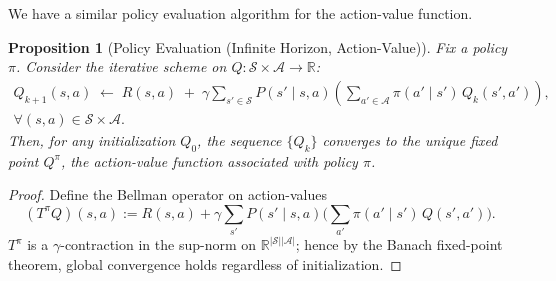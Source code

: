 \documentclass[
]{book}
\newtheorem{proposition}{Proposition}[chapter]
\theoremstyle{definition}
\theoremstyle{definition}
\theoremstyle{definition}
\theoremstyle{definition}
\theoremstyle{remark}
\begin{document}
We have a similar policy evaluation algorithm for the action-value function.

\begin{proposition}[Policy Evaluation (Infinite Horizon, Action-Value)]
\protect\hypertarget{prp:PolicyEvaluationInfiniteHorizonActionValue}{}\label{prp:PolicyEvaluationInfiniteHorizonActionValue}Fix a policy \(\pi\). Consider the iterative scheme on \(Q:\mathcal{S}\times\mathcal{A}\to\mathbb{R}\):
\begin{equation}
\begin{split}
Q_{k+1}(s,a) \;\gets\; R(s,a)
\;+\; \gamma \sum_{s'\in\mathcal{S}} P(s'\mid s,a)\!\left(\sum_{a'\in\mathcal{A}} \pi(a'\mid s')\, Q_k(s',a')\right), 
\\
\forall (s,a)\in\mathcal{S}\times\mathcal{A}.
\end{split}
\label{eq:PolicyEvaluationInfiniteHorizonActionValue}
\end{equation}
Then, for any initialization \(Q_0\), the sequence \(\{Q_k\}\) converges to the unique fixed point \(Q^{\pi}\), the action-value function associated with policy \(\pi\).
\end{proposition}

\begin{proof}
Define the Bellman operator on action-values
\[
(T^{\pi}Q)(s,a) := R(s,a) + \gamma \sum_{s'} P(s'\mid s,a)\Big(\sum_{a'} \pi(a'\mid s')\, Q(s',a')\Big).
\]
\(T^{\pi}\) is a \(\gamma\)-contraction in the sup-norm on \(\mathbb{R}^{|\mathcal{S}||\mathcal{A}|}\); hence by the Banach fixed-point theorem, global convergence holds regardless of initialization.
\end{proof}
\end{document}
